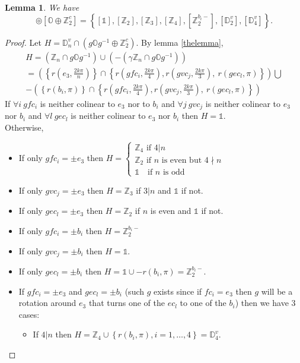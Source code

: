 \documentclass[11pt,a4paper]{amsart}
\newtheorem{lem}[thm]{Lemma}
\theoremstyle{definition}
\newcommand{\ZZ}{\mathbb{Z}}                %
\newcommand{\octa}{\mathbb{O}}              %
\newcommand{\DD}{\mathbb{D}}                %
\newcommand{\1}{\mathds{1}}		            %
\newcommand{\set}[1]{\left\{#1\right\}}     %
\begin{document}
\begin{lem}
We have
\begin{equation*}
[\DD_{n}^{v}] \circledcirc [\octa \oplus \ZZ_2^c]=\set{[\1],[\ZZ_2],[\ZZ_3],[\ZZ_4],[\ZZ_{2}^{b_i-}],[\DD_2^v],[\DD_4^v]}.
\end{equation*}
\end{lem}
\begin{proof}
Let $H=\DD_{n}^v \cap(g \octa g^{-1} \oplus \ZZ_2^c)$.
By lemma \ref{thelemma},
\begin{multline*}
H=(\ZZ_n\cap g \octa g^{-1})\cup (-(\gamma\ZZ_n\cap g \octa g^{-1}))\\
 =\left(\set{r(e_3,\frac{2k\pi}{n})}\cap \set{r(gfc_i,\frac{2k\pi}{4}),r(gvc_j,\frac{2k\pi}{3}),\ r(gec_l,\pi)}\right)\bigcup \\ -\left(\set{r(b_i,\pi)}\cap \set{r(gfc_i,\frac{2k\pi}{4}),r(gvc_j,\frac{2k\pi}{3}),\ r(gec_l,\pi)}\right)
\end{multline*}
If $\forall i\ gfc_i$ is neither colinear to $e_3$ nor to $b_i$ and $\forall j\ gvc_j$ is neither colinear to $e_3$ nor $b_i$ and $\forall l\ gec_l$ is neither colinear to $e_3$ nor $b_i$ then $H=\1$.\\
Otherwise,
\begin{itemize}
\item If only  $gfc_i=\pm e_3$ then $H=
\begin{cases}
\ZZ_4 \text{ if } 4|n \\
\ZZ_2 \text{ if $n$ is even but } 4 \nmid n\\
\1 \quad \text{if $n$ is odd}
\end{cases}$
\item If only $gvc_j=\pm e_3$ then $H=\ZZ_3$ if $3|n$ and $\1$ if not.
\item If only $gec_l=\pm e_3$ then $H=\ZZ_2$ if $n$ is even and $\1$ if not.
\item If only $gfc_i=\pm b_i$ then $H=\ZZ_2^{b_i-}$
\item If only $gvc_j=\pm b_i$ then $H=\1$.
\item If only $gec_l=\pm b_i$ then $H=\1\cup -{r(b_i,\pi)}=\ZZ_2^{b_i-}.$
\item If $gfc_i=\pm e_3$ and $gec_l=\pm b_i$ (such $g$ exists since if $fc_i=e_3$ then $g$ will be a rotation around $e_3$ that turns one of the $ec_l$ to one of the $b_i$) then we have 3 cases:
\begin{itemize}
\item If $4|n$ then $H=\ZZ_4\cup \set{r(b_i,\pi),i=1,\dotsc,4}=\DD_4^v$.\\

\end{itemize}
\end{itemize}
\end{proof}
\end{document}
